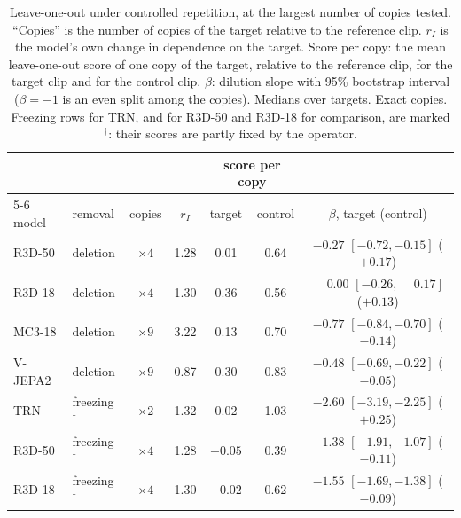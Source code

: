 \begin{table}[h]
\centering
\caption{Leave-one-out under controlled repetition, at the largest number of copies tested. ``Copies'' is the number of copies of the target relative to the reference clip. $r_I$ is the model's own change in dependence on the target. Score per copy: the mean leave-one-out score of one copy of the target, relative to the reference clip, for the target clip and for the control clip. $\beta$: dilution slope with 95\% bootstrap interval ($\beta = -1$ is an even split among the copies). Medians over targets. Exact copies. Freezing rows for TRN, and for R3D-50 and R3D-18 for comparison, are marked $^\dagger$: their scores are partly fixed by the operator.}
\label{tab:e1-loo}
\begin{tabular}{llccccc}
\toprule
 & & & & \multicolumn{2}{c}{score per copy} & \\
\cmidrule(lr){5-6}
model & removal & copies & $r_I$ & target & control & $\beta$, target (control) \\
\midrule
R3D-50  & deletion & $\times 4$ & 1.28 & 0.01 & 0.64 & $-0.27$ $[-0.72, -0.15]$ ($+0.17$) \\
R3D-18  & deletion & $\times 4$ & 1.30 & 0.36 & 0.56 & $\phantom{-}0.00$ $[-0.26, \phantom{-}0.17]$ ($+0.13$) \\
MC3-18  & deletion & $\times 9$ & 3.22 & 0.13 & 0.70 & $-0.77$ $[-0.84, -0.70]$ ($-0.14$) \\
V-JEPA2 & deletion & $\times 9$ & 0.87 & 0.30 & 0.83 & $-0.48$ $[-0.69, -0.22]$ ($-0.05$) \\
\midrule
TRN     & freezing$^\dagger$ & $\times 2$ & 1.32 & 0.02 & 1.03 & $-2.60$ $[-3.19, -2.25]$ ($+0.25$) \\
R3D-50  & freezing$^\dagger$ & $\times 4$ & 1.28 & $-0.05$ & 0.39 & $-1.38$ $[-1.91, -1.07]$ ($-0.11$) \\
R3D-18  & freezing$^\dagger$ & $\times 4$ & 1.30 & $-0.02$ & 0.62 & $-1.55$ $[-1.69, -1.38]$ ($-0.09$) \\
\bottomrule
\end{tabular}
\end{table}

